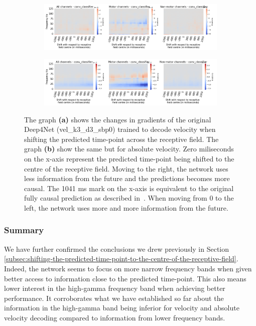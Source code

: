 \begin{figure}[!htbp]
\begin{subfigure}[a]{\textwidth}
   \includegraphics[width=1\linewidth]{img/appendix/C/m/vel/sbp0_m_shift_gradients_conv_classifier_all_kinds}
   \caption{}
   \label{fig:vel-shifting-gradients}
\end{subfigure}

\begin{subfigure}[b]{\textwidth}
   \includegraphics[width=1\linewidth]{img/appendix/C/m/absVel/sbp0_m_shift_gradients_conv_classifier_all_kinds}
   \caption{}
   \label{fig:absVel-shiftig-gradients}
\end{subfigure}
\caption[Gradual shifting - gradients]{The graph \textbf{(a)} shows the changes in gradients of the original Deep4Net (vel\_k3\_d3\_sbp0) trained to decode velocity when shifting the predicted time-point across the receptive field.
The graph \textbf{(b)} show the same but for absolute velocity. Zero miliseconds on the x-axis represent the predicted time-point being shifted to the centre of the receptive field.
Moving to the right, the network uses less information from the future and the predictions becomes more causal.
The 1041 ms mark on the x-axis is equivalent to the original fully causal prediction as described in~\cite{Hammer-2021}.
When moving from 0 to the left, the network uses more and more information from the future.}
\label{fig:shifting-gradients}
\end{figure}

\subsubsection{Summary}\label{subsubsec:across-shiftig-summary}
We have further confirmed the conclusions we drew previously in Section \ref{subsec:shifting-the-predicted-time-point-to-the-centre-of-the-receptive-field}. 
Indeed, the network seems to focus on more narrow frequency bands when given better access to information close to the predicted time-point.
This also means lower interest in the high-gamma frequency band when achieving better performance.
It corroborates what we have established so far about the information in the high-gamma band being inferior for velocity and absolute velocity decoding compared to information from lower frequency bands. 


